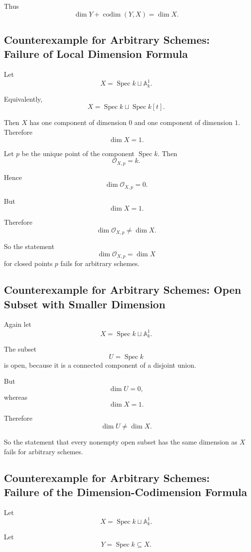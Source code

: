 \documentclass[12pt,a4paper]{article}
\theoremstyle{notespace}
\begin{document}
Thus
\[
\boxed{\dim Y+\operatorname{codim}(Y,X)=\dim X.}
\]

\subsection{Counterexample for Arbitrary Schemes: Failure of Local Dimension Formula}

Let
\[
X=\operatorname{Spec} k\sqcup \mathbb A^1_k.
\]

Equivalently,
\[
X=\operatorname{Spec} k\sqcup \operatorname{Spec} k[t].
\]

Then \(X\) has one component of dimension \(0\) and one component of dimension \(1\). Therefore
\[
\dim X=1.
\]

Let \(p\) be the unique point of the component \(\operatorname{Spec} k\). Then
\[
\mathcal O_{X,p}=k.
\]

Hence
\[
\dim \mathcal O_{X,p}=0.
\]

But
\[
\dim X=1.
\]

Therefore
\[
\boxed{\dim \mathcal O_{X,p}\neq \dim X.}
\]

So the statement
\[
\dim \mathcal O_{X,p}=\dim X
\]
for closed points \(p\) fails for arbitrary schemes.

\subsection{Counterexample for Arbitrary Schemes: Open Subset with Smaller Dimension}

Again let
\[
X=\operatorname{Spec} k\sqcup \mathbb A^1_k.
\]

The subset
\[
U=\operatorname{Spec} k
\]
is open, because it is a connected component of a disjoint union.

But
\[
\dim U=0,
\]
whereas
\[
\dim X=1.
\]

Therefore
\[
\boxed{\dim U\neq \dim X.}
\]

So the statement that every nonempty open subset has the same dimension as \(X\) fails for arbitrary schemes.

\subsection{Counterexample for Arbitrary Schemes: Failure of the Dimension-Codimension Formula}

Let
\[
X=\operatorname{Spec} k\sqcup \mathbb A^1_k.
\]

Let
\[
Y=\operatorname{Spec} k\subseteq X.
\]
\end{document}
